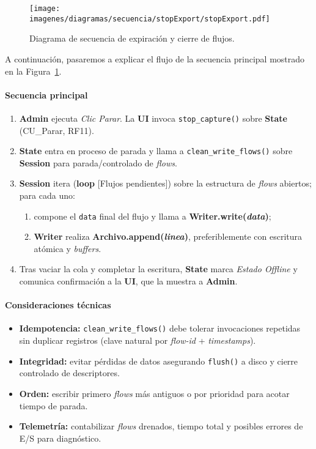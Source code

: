 \begin{figure}[ht!] \centering \texttt{[image: imagenes/diagramas/secuencia/stopExport/stopExport.pdf]} \caption{Diagrama de secuencia de expiración y cierre de flujos.} \label{fig:SeqECF} \end{figure}

A continuación, pasaremos a explicar el flujo de la secuencia principal mostrado en la Figura~\ref{fig:SeqECF}.
\paragraph{Secuencia principal}
\begin{enumerate}
  \item \textbf{Admin} ejecuta \emph{Clic Parar}. La \textbf{UI} invoca \texttt{stop\_capture()} sobre \textbf{State} (CU\_Parar, RF11).
  \item \textbf{State} entra en proceso de parada y llama a \texttt{clean\_write\_flows()} sobre \textbf{Session} para parada/controlado de \emph{flows}.
  \item \textbf{Session} itera (\textbf{loop} [Flujos pendientes]) sobre la estructura de \emph{flows} abiertos; para cada uno:
    \begin{enumerate}
      \item compone el \texttt{data} final del flujo y llama a \textbf{Writer.write(\textit{data})};
      \item \textbf{Writer} realiza \textbf{Archivo.append(\textit{linea})}, preferiblemente con escritura atómica y \emph{buffers}.
    \end{enumerate}
  \item Tras vaciar la cola y completar la escritura, \textbf{State} marca \emph{Estado Offline} y comunica confirmación a la \textbf{UI}, que la muestra a \textbf{Admin}.
\end{enumerate}

\paragraph{Consideraciones técnicas}
\begin{itemize}
  \item \textbf{Idempotencia:} \texttt{clean\_write\_flows()} debe tolerar invocaciones repetidas sin duplicar registros (clave natural por \textit{flow-id} + \emph{timestamps}).
  \item \textbf{Integridad:} evitar pérdidas de datos asegurando \texttt{flush()} a disco y cierre controlado de descriptores.
  \item \textbf{Orden:} escribir primero \emph{flows} más antiguos o por prioridad para acotar tiempo de parada.
  \item \textbf{Telemetría:} contabilizar \emph{flows} drenados, tiempo total y posibles errores de E/S para diagnóstico.
\end{itemize}

